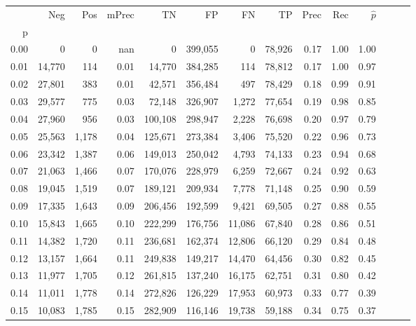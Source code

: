 \begin{tabular}{rrrrrrrrrrrrrr}
\toprule
{} &     Neg &    Pos & mPrec &       TN &       FP &      FN &      TP &  Prec &   Rec & $\hat{p}$ \\
p    &         &        &       &          &          &         &         &       &       &           \\
\midrule
0.00 &       0 &      0 &   nan &        0 &  399,055 &       0 &  78,926 &  0.17 &  1.00 &      1.00 \\
0.01 &  14,770 &    114 &  0.01 &   14,770 &  384,285 &     114 &  78,812 &  0.17 &  1.00 &      0.97 \\
0.02 &  27,801 &    383 &  0.01 &   42,571 &  356,484 &     497 &  78,429 &  0.18 &  0.99 &      0.91 \\
0.03 &  29,577 &    775 &  0.03 &   72,148 &  326,907 &   1,272 &  77,654 &  0.19 &  0.98 &      0.85 \\
0.04 &  27,960 &    956 &  0.03 &  100,108 &  298,947 &   2,228 &  76,698 &  0.20 &  0.97 &      0.79 \\
0.05 &  25,563 &  1,178 &  0.04 &  125,671 &  273,384 &   3,406 &  75,520 &  0.22 &  0.96 &      0.73 \\
0.06 &  23,342 &  1,387 &  0.06 &  149,013 &  250,042 &   4,793 &  74,133 &  0.23 &  0.94 &      0.68 \\
0.07 &  21,063 &  1,466 &  0.07 &  170,076 &  228,979 &   6,259 &  72,667 &  0.24 &  0.92 &      0.63 \\
0.08 &  19,045 &  1,519 &  0.07 &  189,121 &  209,934 &   7,778 &  71,148 &  0.25 &  0.90 &      0.59 \\
0.09 &  17,335 &  1,643 &  0.09 &  206,456 &  192,599 &   9,421 &  69,505 &  0.27 &  0.88 &      0.55 \\
0.10 &  15,843 &  1,665 &  0.10 &  222,299 &  176,756 &  11,086 &  67,840 &  0.28 &  0.86 &      0.51 \\
0.11 &  14,382 &  1,720 &  0.11 &  236,681 &  162,374 &  12,806 &  66,120 &  0.29 &  0.84 &      0.48 \\
0.12 &  13,157 &  1,664 &  0.11 &  249,838 &  149,217 &  14,470 &  64,456 &  0.30 &  0.82 &      0.45 \\
0.13 &  11,977 &  1,705 &  0.12 &  261,815 &  137,240 &  16,175 &  62,751 &  0.31 &  0.80 &      0.42 \\
0.14 &  11,011 &  1,778 &  0.14 &  272,826 &  126,229 &  17,953 &  60,973 &  0.33 &  0.77 &      0.39 \\
0.15 &  10,083 &  1,785 &  0.15 &  282,909 &  116,146 &  19,738 &  59,188 &  0.34 &  0.75 &      0.37 \\

\end{tabular}
